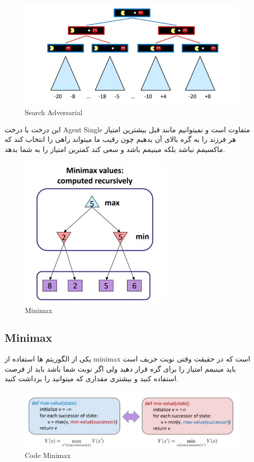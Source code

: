 \begin{figure}[h!]
    \centering
    \includegraphics[width=0.8\linewidth]{images/adversarial02.jpg}
    \caption{Search Adversarial}
\end{figure}

این درخت با درخت Agent Single متفاوت است و نمیتوانیم مانند قبل بیشترین امتیاز هر فرزند را به گره بالای آن بدهیم چون رقیب ما میتواند راهی را انتخاب کند که ماکسیمم نباشد بلکه مینیمم باشد و سعی کند کمترین امتیاز را به شما بدهد.


\begin{figure}[h!]
    \centering
    \includegraphics[width=0.4\linewidth]{images/minimax01.jpg}
    \caption{Minimax}
\end{figure}


\subsection{Minimax}
یکی از الگوریتم ها استفاده از minimax است که در حقیقت وقتی نوبت حریف است باید مینیمم امتیاز را برای گره قرار دهید ولی اگر نوبت شما باشد باید از فرصت استفاده کنید و بیشتری مقداری که میتوانید را برداشت کنید.

\begin{figure}[h!]
    \centering
    \includegraphics[width=0.8\linewidth]{images/minimax02.jpg}
    \caption{Code Minimax}
\end{figure}

